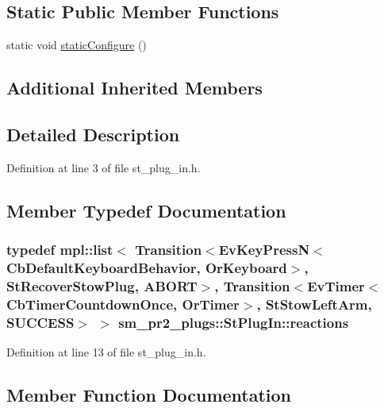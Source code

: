 \subsection*{Static Public Member Functions}
\begin{DoxyCompactItemize}
\item 
static void \hyperlink{structsm__pr2__plugs_1_1StPlugIn_a9098d683bdfaed2a78da207828faa227}{static\+Configure} ()
\end{DoxyCompactItemize}
\subsection*{Additional Inherited Members}


\subsection{Detailed Description}


Definition at line 3 of file st\+\_\+plug\+\_\+in.\+h.



\subsection{Member Typedef Documentation}
\subsubsection[{\texorpdfstring{reactions}{reactions}}]{\setlength{\rightskip}{0pt plus 5cm}typedef mpl\+::list$<$ Transition$<$Ev\+Key\+PressN$<$Cb\+Default\+Keyboard\+Behavior, {\bf Or\+Keyboard}$>$, {\bf St\+Recover\+Stow\+Plug}, {\bf A\+B\+O\+RT}$>$, Transition$<$Ev\+Timer$<$Cb\+Timer\+Countdown\+Once, {\bf Or\+Timer}$>$, {\bf St\+Stow\+Left\+Arm}, {\bf S\+U\+C\+C\+E\+SS}$>$ $>$ {\bf sm\+\_\+pr2\+\_\+plugs\+::\+St\+Plug\+In\+::reactions}}\hypertarget{structsm__pr2__plugs_1_1StPlugIn_a8af73855d8085eb54ef4052001a783d4}{}\label{structsm__pr2__plugs_1_1StPlugIn_a8af73855d8085eb54ef4052001a783d4}


Definition at line 13 of file st\+\_\+plug\+\_\+in.\+h.



\subsection{Member Function Documentation}
